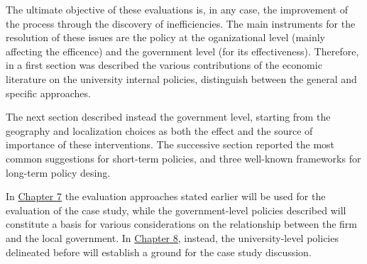 The ultimate objective of these evaluations is, in any case, the improvement of the process through the discovery of inefficiencies. The main instruments for the resolution of these issues are the policy at the oganizational level (mainly affecting the efficence) and the government level (for its effectiveness). Therefore, in a first section was described the various contributions of the economic literature on the university internal policies, distinguish between the general and specific approaches.

The next section described instead the government level, starting from the geography and localization choices as both the effect and the source of importance of these interventions. The successive section reported the most common suggestions for short-term policies, and three well-known frameworks for long-term policy desing.

In \hyperref[Chapter7]{Chapter 7} the evaluation approaches stated earlier will be used for the evaluation of the case study, while the government-level policies described will constitute a basis for various considerations on the relationship between the firm and the local government. In \hyperref[Chapter8]{Chapter 8}, instead, the university-level policies delineated before will establish a ground for the case study discussion.  